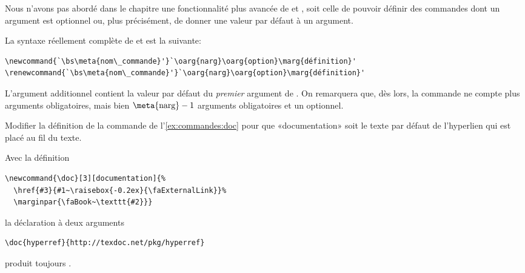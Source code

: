 \begin{exercice}
  Nous n'avons pas abordé dans le chapitre une fonctionnalité plus
  avancée de \cmd{\newcommand} et \cmd{\renewcommand}, soit celle de
  pouvoir définir des commandes dont un argument est optionnel ou,
  plus précisément, de donner une valeur par défaut à un argument.

  La syntaxe réellement complète de \cmd{\newcommand} et
  \cmd{\renewcommand} est la suivante:
\begin{lstlisting}
\newcommand{`\bs\meta{nom\_commande}'}`\oarg{narg}\oarg{option}\marg{définition}'
\renewcommand{`\bs\meta{nom\_commande}'}`\oarg{narg}\oarg{option}\marg{définition}'
\end{lstlisting}
  L'argument additionnel  contient la valeur par défaut
  du \emph{premier} argument de \bs{}. On remarquera
  que, dès lors, la commande ne compte plus  arguments
  obligatoires, mais bien $\text{\meta{narg}} - 1$ arguments
  obligatoires et un optionnel.

  Modifier la définition de la commande \cmdprint{\doc} de
  l'\autoref{ex:commandes:doc} pour que «documentation» soit le texte
  par défaut de l'hyperlien qui est placé au fil du texte.
  \begin{sol}
    Avec la définition
\begin{lstlisting}
\newcommand{\doc}[3][documentation]{%
  \href{#3}{#1~\raisebox{-0.2ex}{\faExternalLink}}%
  \marginpar{\faBook~\texttt{#2}}}
\end{lstlisting}
    la déclaration à deux arguments
\begin{lstlisting}
\doc{hyperref}{http://texdoc.net/pkg/hyperref}
\end{lstlisting}
    produit toujours .
  \end{sol}
\end{exercice}


